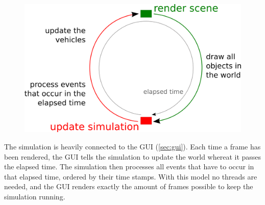 \begin{figure}[H]
\begin{center}
\includegraphics[scale=0.5]{images/simulationprocess.png}
\end{center}
\end{figure}

\noindent The simulation is heavily connected to the GUI (\ref{sec:gui}). Each
time a frame has been rendered, the GUI tells the simulation to update the 
world whereat it passes the elapsed time. The simulation then processes all
events that have to occur in that elapsed time, ordered by their time stamps.
With this model no threads are needed, and the GUI renders exactly the amount
of frames possible to keep the simulation running.

